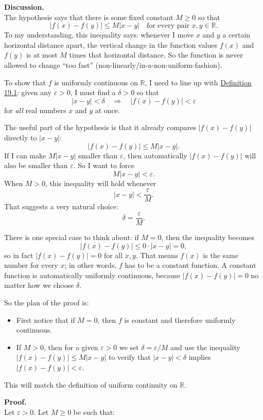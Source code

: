 \documentclass[12pt]{article}
\begin{document}
\textbf{Discussion.} \\
The hypothesis says that there is some fixed constant $M \ge 0$ so that
\[
  |f(x) - f(y)| \le M|x-y| \quad \text{for every pair } x,y \in \mathbb{R}.
\]
To my understanding, this inequality says: whenever I move $x$ and $y$ a certain horizontal distance apart, the vertical change in the function values $f(x)$ and $f(y)$ is at most $M$ times that horizontal distance. So the function is never allowed to change ``too fast'' (non-linearly/in-a-non-uniform-fashion).

To show that $f$ is uniformly continuous on $\mathbb{R}$, I need to line up with \hyperref[def:19.1]{Definition 19.1}: given any $\varepsilon > 0$, I must find a $\delta > 0$ so that
\[
  |x-y| < \delta \quad \Longrightarrow \quad |f(x) - f(y)| < \varepsilon
\]
for \emph{all} real numbers $x$ and $y$ at once.

The useful part of the hypothesis is that it already compares $|f(x)-f(y)|$ directly to $|x-y|$:
\[
  |f(x) - f(y)| \le M|x-y|.
\]
If I can make $M|x-y|$ smaller than $\varepsilon$, then automatically $|f(x)-f(y)|$ will also be smaller than $\varepsilon$.  So I want to force
\[
  M|x-y| < \varepsilon.
\]
When $M>0$, this inequality will hold whenever
\[
  |x-y| < \frac{\varepsilon}{M}.
\]
That suggests a very natural choice:
\[
  \delta = \frac{\varepsilon}{M}.
\]

There is one special case to think about: if $M = 0$, then the inequality becomes
\[
  |f(x) - f(y)| \le 0 \cdot |x-y| = 0,
\]
so in fact $|f(x) - f(y)| = 0$ for all $x,y$.  That means $f(x)$ is the same number for every $x$; in other words, $f$ has to be a constant function. A constant function is automatically uniformly continuous, because $|f(x)-f(y)| = 0$ no matter how we choose $\delta$.

So the plan of the proof is:
\begin{itemize}
  \item First notice that if $M = 0$, then $f$ is constant and therefore uniformly continuous.
  \item If $M > 0$, then for a given $\varepsilon > 0$ we set $\delta = \varepsilon/M$ and use the inequality $|f(x)-f(y)| \le M|x-y|$ to verify that $|x-y|<\delta$ implies $|f(x)-f(y)|<\varepsilon$.
\end{itemize}
This will match the definition of uniform continuity on $\mathbb{R}$.

\vspace{0.25em}

\textbf{Proof.}\\
Let $\varepsilon>0$. Let $M \geq 0$ be such that:
\end{document}
